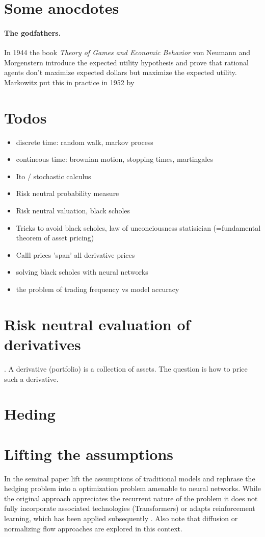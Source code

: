 \documentclass[10pt,a4paper]{article}
\begin{document}
\section{Some anocdotes}
\paragraph{The godfathers.} In 1944 the book \textit{Theory of Games and Economic Behavior} \cite{VonNeumann+Morgenstern:1944} von Neumann and Morgenstern introduce the expected utility hypothesis and prove that rational agents don't maximize expected dollars but maximize the expected utility. Markowitz put this in practice in 1952 by   

\section{Todos}
\begin{itemize}
	\item discrete time: random walk, markov process
	\item contineous time: brownian motion, stopping times, martingales
	\item  Ito / stochastic calculus
	\item Risk neutral probability measure
	\item Risk neutral valuation, black scholes
	\item Tricks to avoid black scholes, law of unconciousness statisician (=fundamental theorem of asset pricing)
	\item Calll prices 'span' all derivative prices
	\item solving black scholes with neural networks
	\item the problem of trading frequency vs model accuracy
\end{itemize}

\section{Risk neutral evaluation of derivatives}. 
A derivative (portfolio) is a collection of assets. The question is how to price such a derivative. 

\section{Heding}

\section{Lifting the assumptions}
In the seminal paper \cite{bühler2018deephedging} lift the assumptions of traditional models and rephrase the hedging problem into a optimization problem amenable to neural networks. While the original approach appreciates the recurrent nature of the  problem it does not fully incorporate associated technologies (Transformers) or adapts reinforcement learning, which has been applied subsequently \cite{Imaki_2023, hambley2023review}. Also note that diffusion or normalizing flow approaches are explored in this context.



\end{document}
